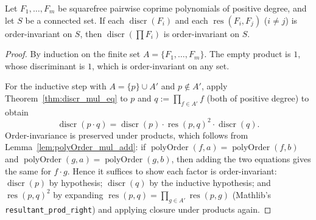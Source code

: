 \begin{lemma}
  \label{lem:discr_prod_order_invariant}
  \leanok
  Let $F_1, \ldots, F_m$ be squarefree pairwise coprime polynomials of positive
  degree, and let $S$ be a connected set.  If each $\operatorname{discr}(F_i)$
  and each $\operatorname{res}(F_i, F_j)$ ($i \ne j$) is order-invariant on
  $S$, then $\operatorname{discr}(\prod F_i)$ is order-invariant on $S$.
\end{lemma}
\begin{proof}
  \leanok
  By induction on the finite set $A = \{F_1, \ldots, F_m\}$.  The empty product
  is $1$, whose discriminant is $1$, which is order-invariant on any set.

  For the inductive step with $A = \{p\} \cup A'$ and $p \notin A'$, apply
  Theorem~\ref{thm:discr_mul_eq} to $p$ and $q := \prod_{f \in A'} f$
  (both of positive degree) to obtain
  \[
    \operatorname{discr}(p \cdot q)
      = \operatorname{discr}(p) \cdot \operatorname{res}(p, q)^2
        \cdot \operatorname{discr}(q).
  \]
  Order-invariance is preserved under products, which follows from
  Lemma~\ref{lem:polyOrder_mul_add}: if
  $\operatorname{polyOrder}(f, a) = \operatorname{polyOrder}(f, b)$ and
  $\operatorname{polyOrder}(g, a) = \operatorname{polyOrder}(g, b)$, then
  adding the two equations gives the same for $f \cdot g$.  Hence it suffices
  to show each factor is order-invariant:
  $\operatorname{discr}(p)$ by hypothesis;
  $\operatorname{discr}(q)$ by the inductive hypothesis;
  and $\operatorname{res}(p, q)^2$ by expanding
  $\operatorname{res}(p, q) = \prod_{g \in A'} \operatorname{res}(p, g)$
  (Mathlib's \texttt{resultant\_prod\_right}) and applying closure under
  products again.
\end{proof}

